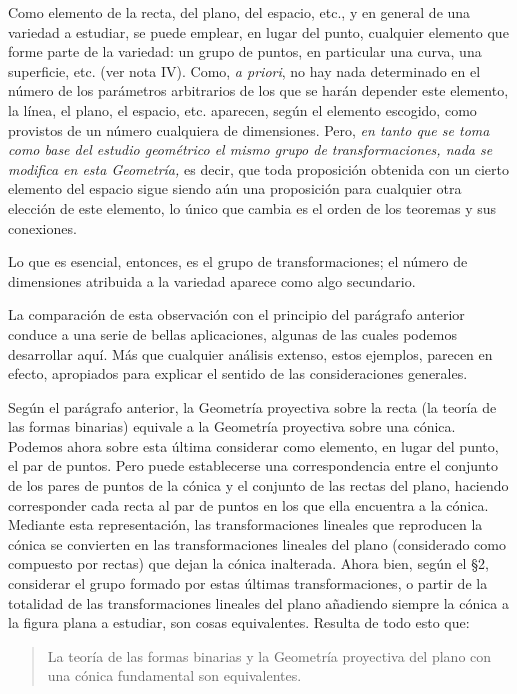 \documentclass[a4paper, 12pt]{article}
\begin{document}
Como elemento de la recta, del plano, del espacio, etc., y en general de una variedad a estudiar, se puede emplear, en lugar del punto, cualquier elemento que forme parte de la variedad: un grupo de puntos, en particular una curva, una superficie, etc. (ver nota IV). Como, \textit{a priori}, no hay nada determinado en el número de los parámetros arbitrarios de los que se harán depender este elemento, la línea, el plano, el espacio, etc. aparecen, según el elemento escogido, como provistos de un número cualquiera de dimensiones. Pero, \textit{en tanto que se toma como base del estudio geométrico el mismo grupo de transformaciones, nada se modifica en esta Geometría, }es decir, que toda proposición obtenida con un cierto elemento del espacio sigue siendo aún una proposición para cualquier otra elección de este elemento, lo único que cambia es el orden de los teoremas y sus conexiones.

Lo que es esencial, entonces, es el grupo de transformaciones; el número de dimensiones atribuida a la variedad aparece como algo secundario.

La comparación de esta observación con el principio del parágrafo anterior conduce a una serie de bellas aplicaciones, algunas de las cuales podemos desarrollar aquí. Más que cualquier análisis extenso, estos ejemplos, parecen en efecto, apropiados para explicar el sentido de las consideraciones generales.

Según el parágrafo anterior, la Geometría proyectiva sobre la recta (la teoría de las formas binarias) equivale a la Geometría proyectiva sobre una cónica. Podemos ahora sobre esta última considerar como elemento, en lugar del punto, el par de puntos. Pero puede establecerse una correspondencia entre el conjunto de los pares de puntos de la cónica y el conjunto de las rectas del plano, haciendo corresponder cada recta al par de puntos en los que ella encuentra a la cónica. Mediante esta representación, las transformaciones lineales que reproducen la cónica se convierten en las transformaciones lineales del plano (considerado como compuesto por rectas) que dejan la cónica inalterada. Ahora bien, según el {\S}2, considerar el grupo formado por estas últimas transformaciones, o partir de la totalidad de las transformaciones lineales del plano añadiendo siempre la cónica a la figura plana a estudiar, son cosas equivalentes. Resulta de todo esto que:

\begin{quote}\it 

La teoría de las formas binarias y la Geometría proyectiva del plano con una cónica fundamental son equivalentes.

\end{quote}
\end{document}
